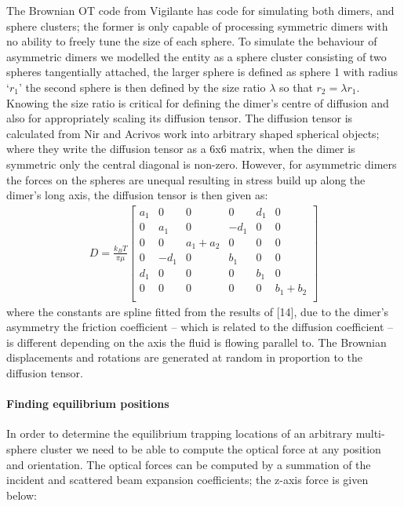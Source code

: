 \documentclass[preprint,  3p]{elsarticle}
\begin{document}
The Brownian OT code from Vigilante has code for simulating both dimers, and sphere clusters; the former is only capable of processing symmetric dimers with no ability to freely tune the size of each sphere. To simulate the behaviour of asymmetric dimers we modelled the entity as a sphere cluster consisting of two spheres tangentially attached, the larger sphere is defined as sphere 1 with radius ‘$r_1$’ the second sphere is then defined by the size ratio $\lambda$ so that $r_2 = \lambda r_1$.  Knowing the size ratio is critical for defining the dimer’s centre of diffusion and also for appropriately scaling its diffusion tensor. The diffusion tensor is calculated from Nir and Acrivos \cite{Nir_1973} work into arbitrary shaped spherical objects; where they write the diffusion tensor as a 6x6 matrix, when the dimer is symmetric only the central diagonal is non-zero. However, for asymmetric dimers the forces on the spheres are unequal resulting in stress build up along the dimer’s long axis, the diffusion tensor is then given as:
\begin{align}
	\label{eq:diffusion}
	D=\frac{k_BT}{\pi\mu}\left[
	\begin{matrix}
		a_1 & 0 & 0 & 0 & d_1 & 0\\
		0 & a_1 & 0 &-d_1 & 0 & 0\\
		0 & 0 & a_1+a_2 & 0 & 0 & 0\\
		0 & -d_1 & 0 & b_1 & 0 & 0\\
		d_1 & 0 & 0 & 0 & b_1 & 0\\
		0 & 0 & 0 & 0 & 0 & b_1+b_2\\
	\end{matrix}\right]
\end{align}
where the constants are spline fitted from the results of [14], due to the dimer’s asymmetry the friction coefficient – which is related to the diffusion coefficient – is different depending on the axis the fluid is flowing parallel to. The Brownian displacements and rotations are generated at random in proportion to the diffusion tensor. 
\paragraph{Finding equilibrium positions}
In order to determine the equilibrium trapping locations of an arbitrary multi-sphere cluster we need to be able to compute the optical force at any position and orientation. The optical forces can be computed by a summation of the incident and scattered beam expansion coefficients; the z-axis force is given below:
\end{document}
